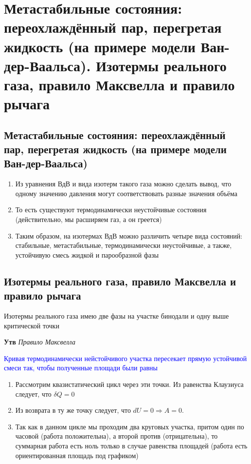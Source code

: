 \documentclass[a4paper, 14pt]{article}
\begin{document}
    \section{Метастабильные состояния: переохлаждённый пар, перегретая жидкость (на примере модели Ван-дер-Ваальса).
    Изотермы реального газа, правило Максвелла и правило рычага}

    \subsection{Метастабильные состояния: переохлаждённый пар, перегретая жидкость (на примере модели Ван-дер-Ваальса)}

    \begin{enumerate}
        \item Из уравнения ВдВ и вида изотерм такого газа можно сделать вывод, что одному значению давления могут
        соответствовать разные значения объёма
        \item То есть существуют термодинамически неустойчивые состояния (действительно, мы расширяем газ, а он греется)
        \item Таким образом, на изотермах ВдВ можно различить четыре вида состояний: стабильные, метастабильные,
        термодинамически неустойчивые, а также, устойчивую смесь жидкой и парообразной фазы
    \end{enumerate}

    \subsection{Изотермы реального газа, правило Максвелла и правило рычага}

    Изотермы реального газа имею две фазы на участке бинодали и одну выше критической точки

    \textbf{Утв} \textit{Правило Максвелла}

    \textcolor{blue}{Кривая термодинамически нейстойчивого участка пересекает прямую устойчивой смеси так, чтобы
    полученные площади были равны}

    \begin{enumerate}
        \item Рассмотрим квазистатический цикл через эти точки.
        Из равенства Клаузиуса следует, что $\delta Q = 0$
        \item Из возврата в ту же точку следует, что $dU = 0 \Rightarrow A = 0$.
        \item Так как в данном цикле мы проходим два круговых участка, притом один по часовой (работа положительна),
        а второй против (отрицательна), то суммарная работа есть ноль только в случае равенства площадей (работа есть
        ориентированная площадь под графиком)
    \end{enumerate}
\end{document}
